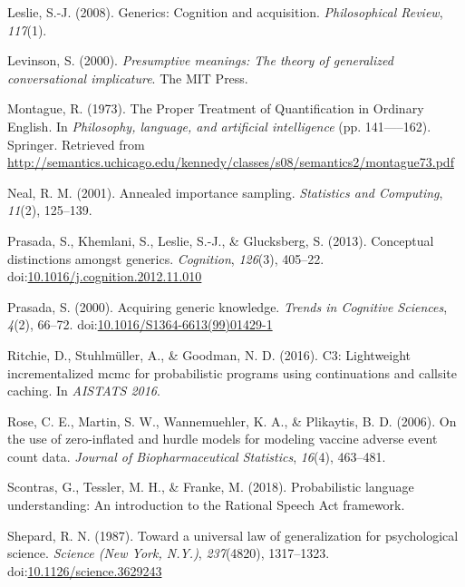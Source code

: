\documentclass[floatsintext,doc]{apa6}
\begin{document}
\leavevmode\hypertarget{ref-Leslie2008}{}%
Leslie, S.-J. (2008). Generics: Cognition and acquisition. \emph{Philosophical Review}, \emph{117}(1).

\leavevmode\hypertarget{ref-Levinson2000}{}%
Levinson, S. (2000). \emph{Presumptive meanings: The theory of generalized conversational implicature}. The MIT Press.

\leavevmode\hypertarget{ref-Montague1973}{}%
Montague, R. (1973). The Proper Treatment of Quantification in Ordinary English. In \emph{Philosophy, language, and artificial intelligence} (pp. 141-----162). Springer. Retrieved from \url{http://semantics.uchicago.edu/kennedy/classes/s08/semantics2/montague73.pdf}

\leavevmode\hypertarget{ref-neal2001annealed}{}%
Neal, R. M. (2001). Annealed importance sampling. \emph{Statistics and Computing}, \emph{11}(2), 125--139.

\leavevmode\hypertarget{ref-Prasada2013}{}%
Prasada, S., Khemlani, S., Leslie, S.-J., \& Glucksberg, S. (2013). Conceptual distinctions amongst generics. \emph{Cognition}, \emph{126}(3), 405--22. doi:\href{https://doi.org/10.1016/j.cognition.2012.11.010}{10.1016/j.cognition.2012.11.010}

\leavevmode\hypertarget{ref-Prasada2000}{}%
Prasada, S. (2000). Acquiring generic knowledge.  \emph{Trends in Cognitive Sciences}, \emph{4}(2), 66--72. doi:\href{https://doi.org/10.1016/S1364-6613(99)01429-1}{10.1016/S1364-6613(99)01429-1}

\leavevmode\hypertarget{ref-Ritchie2016}{}%
Ritchie, D., Stuhlmüller, A., \& Goodman, N. D. (2016). C3: Lightweight incrementalized mcmc for probabilistic programs using continuations and callsite caching. In \emph{AISTATS 2016}.

\leavevmode\hypertarget{ref-hurdleModels}{}%
Rose, C. E., Martin, S. W., Wannemuehler, K. A., \& Plikaytis, B. D. (2006). On the use of zero-inflated and hurdle models for modeling vaccine adverse event count data. \emph{Journal of Biopharmaceutical Statistics}, \emph{16}(4), 463--481.

\leavevmode\hypertarget{ref-problang}{}%
Scontras, G., Tessler, M. H., \& Franke, M. (2018). Probabilistic language understanding: An introduction to the Rational Speech Act framework.

\leavevmode\hypertarget{ref-Shepard1987}{}%
Shepard, R. N. (1987). Toward a universal law of generalization for psychological science. \emph{Science (New York, N.Y.)}, \emph{237}(4820), 1317--1323. doi:\href{https://doi.org/10.1126/science.3629243}{10.1126/science.3629243}
\end{document}
